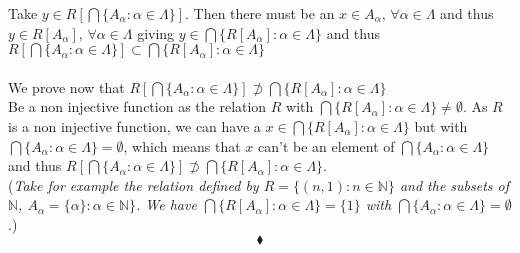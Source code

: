  Take  $y\in R\left[\bigcap\{A_{\alpha}:\alpha \in \Lambda\}\right]$. Then there must be an $x\in A_{\alpha},\, \forall \alpha \in \Lambda$ and thus $y\in R[A_{\alpha}],\, \forall \alpha \in \Lambda$ giving $y\in  \bigcap\{R[A_{\alpha}]:\alpha \in \Lambda\}$ and thus $R\left[\bigcap\{A_{\alpha}:\alpha \in \Lambda\}\right]\subset \bigcap\{R[A_{\alpha}]:\alpha \in \Lambda\}$\\\\
We prove now that $R\left[\bigcap\{A_{\alpha}:\alpha \in \Lambda\}\right]\not\supset \bigcap\{R[A_{\alpha}]:\alpha \in \Lambda\}$\\
Be a non injective function as the relation $R$ with $\bigcap\{R[A_{\alpha}]:\alpha \in \Lambda\}\ne\emptyset$. As $R$ is a non injective function, we can have a $x\in \bigcap\{R[A_{\alpha}]:\alpha \in \Lambda\}$ but with $\bigcap\{A_{\alpha}:\alpha \in \Lambda\}=\emptyset$, which means that $x$ can't be an element of $\bigcap\{A_{\alpha}:\alpha \in \Lambda\}$ and thus $R\left[\bigcap\{A_{\alpha}:\alpha \in \Lambda\}\right]\not\supset \bigcap\{R[A_{\alpha}]:\alpha \in \Lambda\}$.\\
(\textit{Take for example the relation defined by $R=\{(n,1):n\in \mathbb{N}\}$ and the subsets of $\mathbb{N}$, $A_{\alpha}=\{\alpha \}: \alpha \in \mathbb{N}\}$. We have $\bigcap\{R[A_{\alpha}]:\alpha \in \Lambda\}=\{1\}$ with $\bigcap\{A_{\alpha}:\alpha \in \Lambda\}=\emptyset$ }.)
$$\blacklozenge$$

